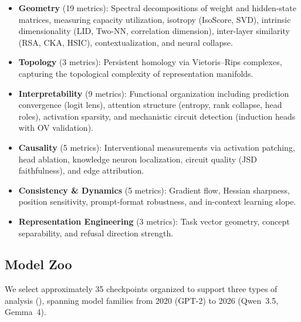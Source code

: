 \documentclass{article}
\begin{document}
\begin{itemize}
  \item \textbf{Geometry} (19 metrics): Spectral decompositions of weight and hidden-state matrices, measuring capacity utilization, isotropy (IsoScore, SVD), intrinsic dimensionality (LID, Two-NN, correlation dimension), inter-layer similarity (RSA, CKA, HSIC), contextualization, and neural collapse.
  \item \textbf{Topology} (3 metrics): Persistent homology via Vietoris--Rips complexes, capturing the topological complexity of representation manifolds.
  \item \textbf{Interpretability} (9 metrics): Functional organization including prediction convergence (logit lens), attention structure (entropy, rank collapse, head roles), activation sparsity, and mechanistic circuit detection (induction heads with OV validation).
  \item \textbf{Causality} (5 metrics): Interventional measurements via activation patching, head ablation, knowledge neuron localization, circuit quality (JSD faithfulness), and edge attribution.
  \item \textbf{Consistency \& Dynamics} (5 metrics): Gradient flow, Hessian sharpness, position sensitivity, prompt-format robustness, and in-context learning slope.
  \item \textbf{Representation Engineering} (3 metrics): Task vector geometry, concept separability, and refusal direction strength.
\end{itemize}

\subsection{Model Zoo}
\label{sec:models}

We select approximately 35 checkpoints organized to support three types of analysis (), spanning model families from 2020 (GPT-2) to 2026 (Qwen~3.5, Gemma~4).
\end{document}
